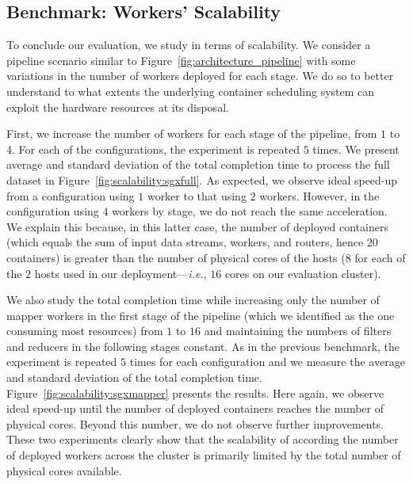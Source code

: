 \subsection{Benchmark: Workers' Scalability}
To conclude our evaluation, we study \SYS{} in terms of scalability.
We consider a pipeline scenario similar to Figure~\ref{fig:architecture_pipeline} with some variations in the number of workers deployed for each stage.
We do so to better understand to what extents the underlying container scheduling system can exploit the hardware resources at its disposal.

First, we increase the number of workers for each stage of the pipeline, from $1$ to $4$.
For each of the configurations, the experiment is repeated $5$ times.
We present average and standard deviation of the total completion time to process the full dataset in Figure~\ref{fig:scalability:sgxfull}.
As expected, we observe ideal speed-up from a configuration using $1$ worker to that using $2$ workers.
However, in the configuration using $4$ workers by stage, we do not reach the same acceleration.
We explain this because, in this latter case, the number of deployed containers (which equals the sum of input data streams, workers, and routers, hence $20$ containers) is greater than the number of physical cores of the hosts ($8$ for each of the $2$ hosts used in our deployment---\emph{i.e.}, $16$ cores on our evaluation cluster).

We also study the total completion time while increasing only the number of mapper workers in the first stage of the pipeline (which we identified as the one consuming most resources) from $1$ to $16$ and maintaining the numbers of filters and reducers in the following stages constant.
As in the previous benchmark, the experiment is repeated $5$ times for each configuration and we measure the average and standard deviation of the total completion time.
Figure~\ref{fig:scalability:sgxmapper} presents the results.
Here again, we observe ideal speed-up until the number of deployed containers reaches the number of physical cores.
Beyond this number, we do not observe further improvements.
These two experiments clearly show that the scalability of \SYS{} according the number of deployed workers across the cluster is primarily limited by the total number of physical cores available.


